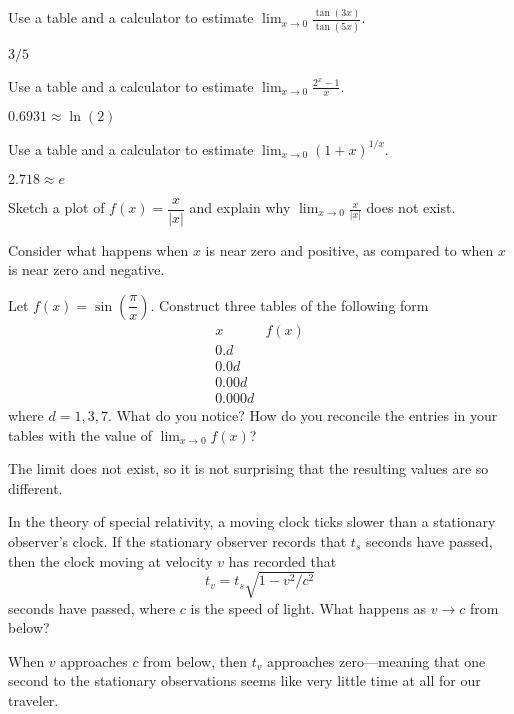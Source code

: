 \begin{exercises}
\begin{exercise} 
Use a table and a calculator to estimate $\lim_{x\to 0}\frac{\tan(3x)}{\tan(5x)}$.
\begin{answer}
  $3/5$
\end{answer}
\end{exercise}

\begin{exercise} 
Use a table and a calculator to estimate $\lim_{x\to 0}
\frac{2^x-1}{x}$.
\begin{answer}
  $0.6931\approx\ln(2)$
\end{answer}
\end{exercise}

\begin{exercise} 
Use a table and a calculator to estimate $\lim_{x\to 0} (1+x)^{1/x}$. 
\begin{answer}
  $2.718 \approx e$
\end{answer}
\end{exercise}



\begin{exercise} 
Sketch a plot of $f(x) = \dfrac{x}{|x|}$ and explain why $\lim_{x\to
  0} \frac{x}{|x|}$ does not exist.
\begin{answer}
  Consider what happens when $x$ is near zero and positive, as compared to when $x$ is near zero and negative.
\end{answer}
\end{exercise}



\begin{exercise} 
Let $f(x) = \sin\left(\dfrac{\pi}{x}\right)$. Construct three tables
of the following form
\[
\begin{array}{l|l}
 x & f(x) \\ \hline
 0.d &   \\
 0.0d &  \\
 0.00d &   \\
 0.000d &  
\end{array}
\]
where $d = 1,3,7$. What do you notice? How do you reconcile the
entries in your tables with the value of $\lim_{x\to 0} f(x)$?
\begin{answer}
  The limit does not exist, so it is not surprising that the resulting values are so different.
\end{answer}
\end{exercise}


\begin{exercise}
In the theory of special relativity, a moving clock ticks slower than
a stationary observer's clock. If the stationary observer records that
$t_s$ seconds have passed, then the clock moving at velocity $v$ has
recorded that
\[
t_v = t_s \sqrt{1 - v^2/c^2}
\]
seconds have passed, where $c$ is the speed of light. What happens as $v\to c$ from below?
\begin{answer}
  When $v$ approaches $c$ from below, then $t_v$ approaches zero---meaning that one second to the stationary observations seems like very little time at all for our traveler.
\end{answer}
\end{exercise}



\end{exercises}
